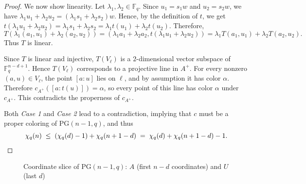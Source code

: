 \documentclass[11pt]{article}
\theoremstyle{plain}
\newcommand{\PG}{\mathrm{PG}}
\begin{document}
\begin{proof}
We now show linearity.
Let $\lambda_1,\lambda_2\in\mathbb F_q$. Since $u_1=s_1w$ and $u_2=s_2w$, we have $\lambda_1u_1+\lambda_2u_2=(\lambda_1s_1+\lambda_2s_2)w$. Hence, by the definition of $t$, we get $t(\lambda_1u_1+\lambda_2u_2)=\lambda_1s_1+\lambda_2s_2=\lambda_1t(u_1)+\lambda_2t(u_2)$.
Therefore,
\[
T(\lambda_1(a_1,u_1)+\lambda_2(a_2,u_2))
=
(\lambda_1a_1+\lambda_2a_2,t(\lambda_1u_1+\lambda_2u_2))
=
\lambda_1T(a_1,u_1)+\lambda_2T(a_2,u_2).
\]
Thus $T$ is linear.

Since $T$ is linear and injective, $T(V_\ell)$ is a $2$-dimensional vector subspace of $\mathbb F_q^{n-d+1}$. Hence $T(V_\ell)$ corresponds to a projective line in $A^+$.
For every nonzero $(a,u)\in V_\ell$, the point $[a:u]$ lies on $\ell$, and by assumption it has color $\alpha$. Therefore $c_{A^+}([a:t(u)])=\alpha$, so every point of this line has color $\alpha$ under $c_{A^+}$.
This contradicts the properness of $c_{A^+}$.

\vspace{2ex}
\noindent
Both \textit{Case 1} and \textit{Case 2} lead to a contradiction, implying that $c$ must be a proper coloring of $\mathrm{PG}(n - 1, q)$, and thus
\[
\chi_q(n)\;\le\; (\chi_q(d)-1)+\chi_q(n+1-d)\;=\;\chi_q(d)+\chi_q(n+1-d)-1. \qedhere
\]
\end{proof}

\begin{figure}[!t]
  \centering
  \caption{Coordinate slice of $\PG(n-1,q)$: $A$ (first $n\!-\!d$ coordinates) and $U$ (last $d$)}
  \label{fig:fig1}
\end{figure}
\end{document}
